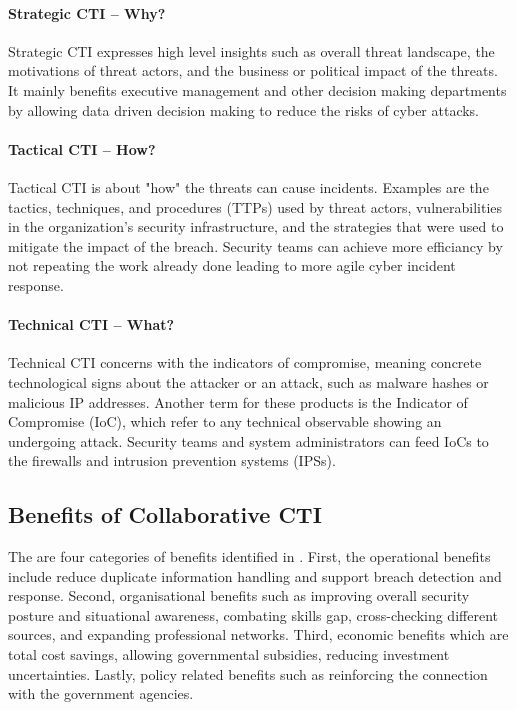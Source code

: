 \paragraph{Strategic CTI -- Why?}
Strategic CTI expresses high level insights such as overall threat landscape, the motivations of threat actors, and the business or political impact of the threats. It mainly benefits executive management and other decision making departments by allowing data driven decision making to reduce the risks of cyber attacks.

\paragraph{Tactical CTI -- How?}
Tactical CTI is about "how" the threats can cause incidents. Examples are the tactics, techniques, and procedures (TTPs) used by threat actors, vulnerabilities in the organization's security infrastructure, and the strategies that were used to mitigate the impact of the breach. Security teams can achieve more efficiancy by not repeating the work already done leading to more agile cyber incident response.

\paragraph*{Technical CTI -- What?}
Technical CTI concerns with the indicators of compromise, meaning concrete technological signs about the attacker or an attack, such as malware hashes or malicious IP addresses. Another term for these products is the Indicator of Compromise (IoC), which refer to any technical observable showing an undergoing attack. Security teams and system administrators can feed IoCs to the firewalls and intrusion prevention systems (IPSs).

\subsection{Benefits of Collaborative CTI}
The are four categories of benefits identified in \cite{zibak_cyber_2019}. First, the operational benefits include reduce duplicate information handling and support breach detection and response. Second, organisational benefits such as improving overall security posture and situational awareness, combating skills gap, cross-checking different sources, and expanding professional networks. Third, economic benefits which are total cost savings, allowing governmental subsidies, reducing investment uncertainties. Lastly, policy related benefits such as reinforcing the connection with the government agencies.

